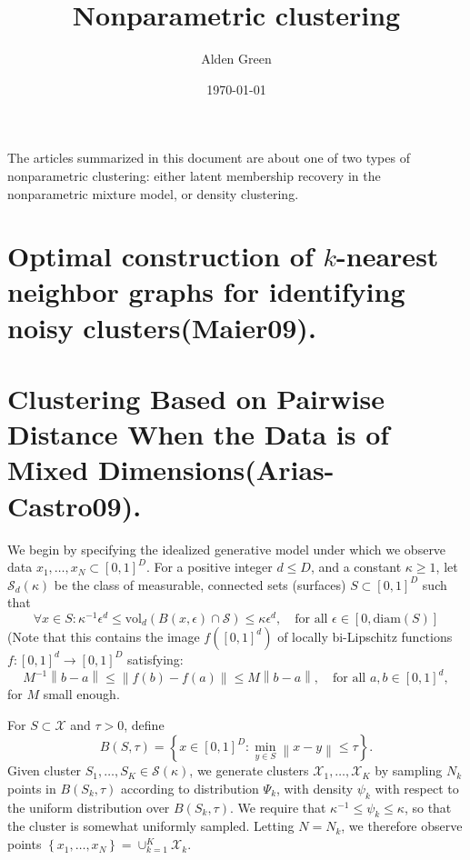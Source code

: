 \documentclass{article}
\newcommand{\norm}[1]{\left\lVert#1\right\rVert}
\newcommand{\set}[1]{\left\{#1\right\}}
\newcommand{\diam}{\mathrm{diam}}
\newcommand{\vol}{\text{vol}}
\newcommand{\1}{\mathbb{I}}
\theoremstyle{alden}
\theoremstyle{aldenthm}
\theoremstyle{definition}
\theoremstyle{remark}
\begin{document}
\title{Nonparametric clustering}
\author{Alden Green}
\date{\today}
\maketitle

The articles summarized in this document are about one of two types of nonparametric clustering: either latent membership recovery in the nonparametric mixture model, or density clustering.

\section{Optimal construction of $k$-nearest neighbor graphs for identifying noisy clusters(Maier09).}

\section{Clustering Based on Pairwise Distance When the Data is of Mixed Dimensions(Arias-Castro09).}

We begin by specifying the idealized generative model under which we observe data $x_1, \ldots, x_N \subset [0,1]^D$. For a positive integer $d \leq D$, and a constant $\kappa \geq 1$, let $\mathcal{S}_{d}(\kappa)$ be the class of measurable, connected sets (surfaces) $S \subset [0,1]^D$ such that
\begin{equation*}
\forall x \in S: \kappa^{-1}\epsilon^d \leq \vol_d(B(x,\epsilon) \cap \mathcal{S}) \leq \kappa \epsilon^d, \quad \textrm{for all $\epsilon \in [0,\diam(S)]$}
\end{equation*}
(Note that this contains the image $f([0,1]^d)$ of locally bi-Lipschitz functions $f: [0,1]^d \to [0,1]^D$ satisfying:
\begin{equation*}
M^{-1} \norm{b - a} \leq \norm{f(b) - f(a)} \leq M \norm{b - a}, \quad \textrm{for all $a,b \in [0,1]^d,$}
\end{equation*}
for $M$ small enough. 

For $S \subset \mathcal{X}$ and $\tau > 0$, define
\begin{equation*}
B(S,\tau) = \set{x \in [0,1]^D: \min_{y \in S} \norm{x - y} \leq \tau}.
\end{equation*}
Given cluster $S_1, \ldots, S_{K} \in \mathcal{S}(\kappa)$, we generate clusters $\mathcal{X}_1, \ldots, \mathcal{X}_K$ by sampling $N_k$ points in $B(S_k, \tau)$ according to distribution $\Psi_k$, with density $\psi_k$ with respect to the uniform distribution over $B(S_k,\tau)$. We require that $\kappa^{-1} \leq \psi_k \leq \kappa$, so that the cluster is somewhat uniformly sampled. Letting $N = N_k$, we therefore observe points $\set{x_1, \ldots, x_N} = \cup_{k = 1}^{K} \mathcal{X}_k$. 
\end{document}
